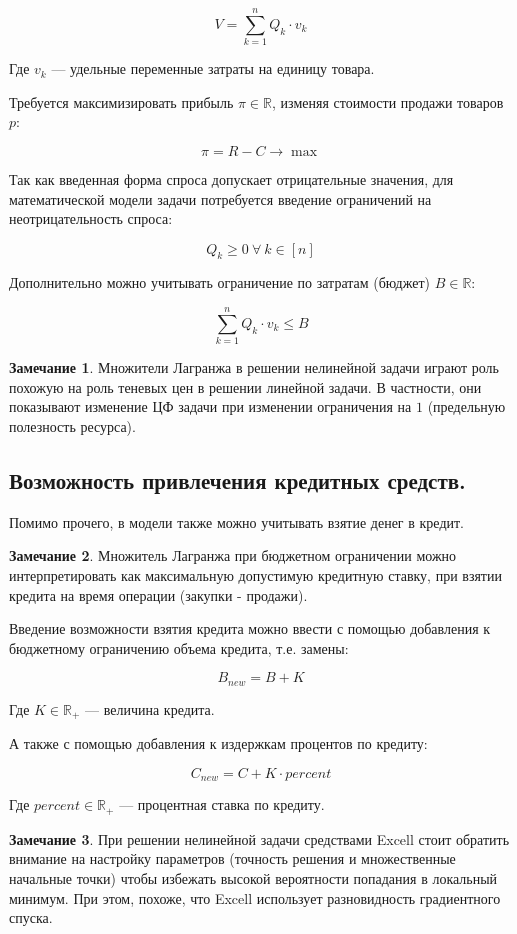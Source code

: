 \documentclass[reqno]{article}
\theoremstyle{definition}
\newtheorem*{nb}{Замечание}
\theoremstyle{definition}
\theoremstyle{definition}
\theoremstyle{definition}
\theoremstyle{definition}
\theoremstyle{definition}
\theoremstyle{definition}
\theoremstyle{definition}
\theoremstyle{definition}
\begin{document}
			$$V = \sum^n_{k=1} Q_k\cdot v_k$$

			Где $v_k$ --- удельные переменные затраты на единицу товара.

			Требуется максимизировать прибыль $\pi \in \mathds{R}$, изменяя стоимости продажи товаров $p$:

			$$\pi = R - C \rightarrow \max$$	

			Так как введенная форма спроса допускает отрицательные значения, для математической модели задачи потребуется введение ограничений на неотрицательность спроса:

			$$Q_k \geq 0\ \forall\ k \in [n]$$		

			Дополнительно можно учитывать ограничение по затратам (бюджет) $B \in \mathds{R}$:

			$$\sum^n_{k=1}Q_k\cdot v_k \leq B$$

			\begin{nb}
				Множители Лагранжа в решении нелинейной задачи играют роль похожую на роль теневых цен в решении линейной задачи. В частности, они показывают изменение ЦФ задачи при изменении ограничения на $1$ (предельную полезность ресурса).
			\end{nb}

		\subsection{Возможность привлечения кредитных средств.}

			Помимо прочего, в модели также можно учитывать взятие денег в кредит.			
			
			\begin{nb}
				Множитель Лагранжа при бюджетном ограничении можно интерпретировать как максимальную допустимую кредитную ставку, при взятии кредита на время операции (закупки - продажи).
			\end{nb}
			
			Введение возможности взятия кредита можно ввести с помощью добавления к бюджетному ограничению объема кредита, т.е. замены:

			$$B_{new} = B + K$$

			Где $K \in \mathds{R}_+$ --- величина кредита.

			А также с помощью добавления к издержкам процентов по кредиту:

			$$C_{new} = C + K\cdot percent$$

			Где $percent \in \mathds{R_+}$ --- процентная ставка по кредиту.


			\begin{nb}
				При решении нелинейной задачи средствами Excell стоит обратить внимание на настройку параметров (точность решения и множественные начальные точки) чтобы избежать высокой вероятности попадания в локальный минимум. При этом, похоже, что Excell использует разновидность градиентного спуска.
			\end{nb}
\end{document}
